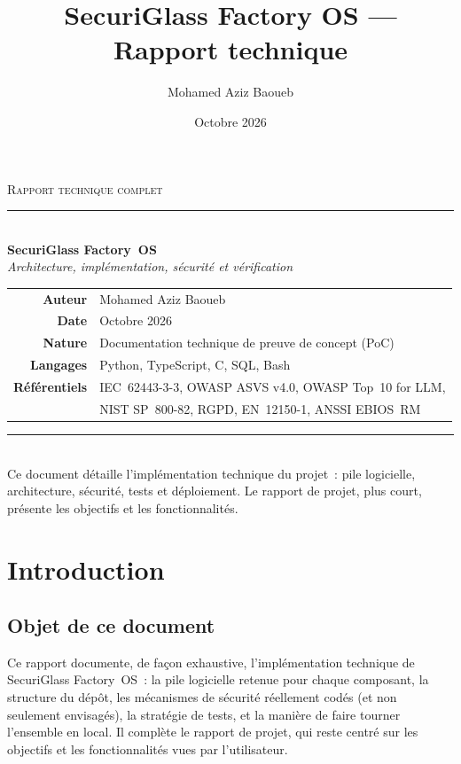 \documentclass[11pt,a4paper]{report}
\title{SecuriGlass Factory OS --- Rapport technique}
\author{Mohamed Aziz Baoueb}
\date{Octobre 2026}
\begin{document}
\begin{titlepage}
  \centering
  \vspace*{2.2cm}

  {\Large\scshape Rapport technique complet}\\[0.6cm]
  \textcolor{rulegray}{\rule{0.5\linewidth}{0.4pt}}\\[1.4cm]

  {\fontsize{32}{38}\selectfont\bfseries\color{accent} SecuriGlass Factory~OS}\\[0.5cm]
  {\Large\itshape Architecture, implémentation, sécurité et vérification}\\[2.2cm]

  \begin{tabular}{rl}
    \textbf{Auteur} & Mohamed Aziz Baoueb \\[4pt]
    \textbf{Date} & Octobre 2026 \\[4pt]
    \textbf{Nature} & Documentation technique de preuve de concept (PoC) \\[4pt]
    \textbf{Langages} & Python, TypeScript, C, SQL, Bash \\[4pt]
    \textbf{Référentiels} & IEC~62443-3-3, OWASP ASVS v4.0, OWASP Top~10 for LLM,\\
     & NIST SP~800-82, RGPD, EN~12150-1, ANSSI EBIOS~RM \\
  \end{tabular}

  \vfill
  \textcolor{rulegray}{\rule{0.5\linewidth}{0.4pt}}\\[0.4cm]
  {\small Ce document détaille l'implémentation technique du projet~: pile
  logicielle, architecture, sécurité, tests et déploiement. Le rapport de
  projet, plus court, présente les objectifs et les fonctionnalités.}
\end{titlepage}

\tableofcontents

\chapter{Introduction}

\section{Objet de ce document}
Ce rapport documente, de façon exhaustive, l'implémentation technique de
SecuriGlass Factory~OS~: la pile logicielle retenue pour chaque composant, la
structure du dépôt, les mécanismes de sécurité réellement codés (et non
seulement envisagés), la stratégie de tests, et la manière de faire tourner
l'ensemble en local. Il complète le rapport de projet, qui reste centré sur les
objectifs et les fonctionnalités vues par l'utilisateur.
\end{document}
